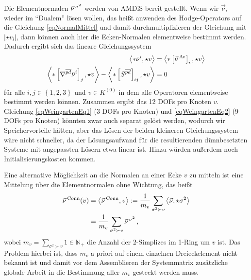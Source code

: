     Die Elementnormalen \( \vec{\nu}^{\,\sigma^{2}} \) werden von AMDiS bereit gestellt.
    Wenn wir \( \vec{\nu}_{i} \) wieder im "`Dualem"' lösen wollen, das heißt anwenden des Hodge-Operators auf die Gleichung
    \eqref{eqNormalMittel} und damit durchmultiplizieren der Gleichung mit \( \left| \star v_{i} \right| \), dann können auch hier die
    Ecken-Normalen elementweise bestimmt werden.
    Dadurch ergibt sich das lineare Gleichungssystem
    \begin{align}
        \label{eqWeingartenEq1}
        \left\langle *\bar{\nu}^{i} , \star v \right\rangle 
                &= \left\langle *\left[ \vec{\nu}^{\,\text{Av}} \right]_{i}, \star v \right\rangle \\
        \label{eqWeingartenEq2}
        \left\langle *\left[ \nabla^{\overline{pd}}\bar{\nu}^{i} \right]_{j} , \star v \right\rangle
            - \left\langle *\left[ S^{\overline{pd}} \right]_{ij} , \star v \right\rangle 
                &= 0
    \end{align}
    für alle \( i,j\in\left\{ 1,2,3 \right\} \) und \( v\in K^{(0)} \) in dem alle Operatoren elementweise bestimmt werden können.
    Zusammen ergibt das 12 DOFs pro Knoten \( v \).
    Gleichung \eqref{eqWeingartenEq1} (3 DOFs pro Knoten) und \eqref{eqWeingartenEq2} (9 DOFs pro Knoten) 
    könnten zwar auch separat gelöst werden, wodurch wir
    Speichervorteile hätten, aber das Lösen der beiden kleineren Gleichungssystem wäre nicht schneller, 
    da der Lösungsaufwand für die
    resultierenden dünnbesetzten Systeme mit angepassten Lösern etwa linear ist.
    Hinzu würden außerdem noch Initialisierungskosten kommen.

    Eine alternative Möglichkeit an die Normalen an einer Ecke \( v \) zu mitteln ist eine Mittelung über die Elementnormalen ohne
    Wichtung, das heißt
    \begin{align}
      \label{eqNormalConnMittel}
      \begin{aligned}
      \vec{\nu}^{\,\text{Conn}}(v) &= \left\langle \vec{\nu}^{\,\text{Conn}}, v \right\rangle 
          := \frac{1}{m_{v}} \sum_{\sigma^{2}\succ v}
                      \left\langle \vec{\nu}, \star\sigma^{2} \right\rangle \\
          &= \frac{1}{m_{v}} \sum_{\sigma^{2}\succ v}
                                          \vec{\nu}^{\,\sigma^{2}} \,\text{,}
     \end{aligned}
    \end{align}
    wobei \( m_{v} = \sum_{\sigma^{2}\succ v} 1 \in \mathds{N}_{+}\) die Anzahl der \( 2 \)-Simplizes im 1-Ring um \( v \) ist.
    Das Problem hierbei ist, dass \( m_{v} \) a priori auf einem einzelnen Dreieckelement nicht bekannt ist und damit vor dem Assemblieren
    der Systemmatrix zusätzliche globale Arbeit in die Bestimmung aller \( m_{v} \) gesteckt werden muss.
    
